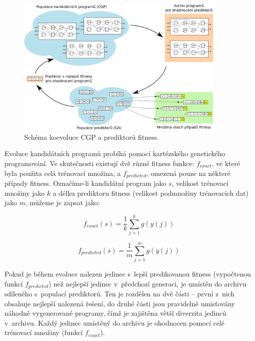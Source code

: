 \begin{figure}[htb]
    \centering\includegraphics[width=0.9\textwidth]{fig/coevolution.pdf}
    \caption{Schéma koevoluce CGP a prediktorů fitness.}
    \label{obrKoevoluce}
\end{figure}

Evoluce kandidátních programů probíhá pomocí kartézského genetického programování. Ve skutečnosti existují dvě různé fitness funkce: $f_{\mathit{exact}}$, ve které byla použita celá trénovací množina, a $f_{\mathit{predicted}}$, omezená pouze na některé případy fitness. Označíme-li kandidátní program jako $s$, velikost trénovací množiny jako $k$ a délku prediktoru fitness (velikost podmnožiny trénovacích dat) jako $m$, můžeme je zapsat jako:

\begin{equation}
    \label{eqFexact}
    f_{\mathit{exact}} \left( s \right) = \frac{1}{k} \sum\limits_{j=1}^{k} g \left( y \left( j \right) \right)
\end{equation}

\begin{equation}
    \label{eqFpredicted}
    f_{\mathit{predicted}} \left( s \right) = \frac{1}{m} \sum\limits_{j=1}^{m} g \left( y \left( j \right) \right)
\end{equation}

Pokud je během evoluce nalezen jedinec s~lepší predikovanou fitness (vypočtenou funkcí $f_{\mathit{predicted}}$) než nejlepší jedinec v~předchozí generaci, je umístěn do archivu sdíleného s~populací prediktorů. Ten je rozdělen na dvě části -- první z~nich obsahuje nejlepší nalezená řešení, do druhé části jsou pravidelně umisťovány náhodně vygenerované programy, čímž je zajištěna větší diverzita jedinců v~archivu. Každý jedinec umístěný do archivu je ohodnocen pomocí celé trénovací množiny (funkcí $f_{\mathit{exact}}$).

